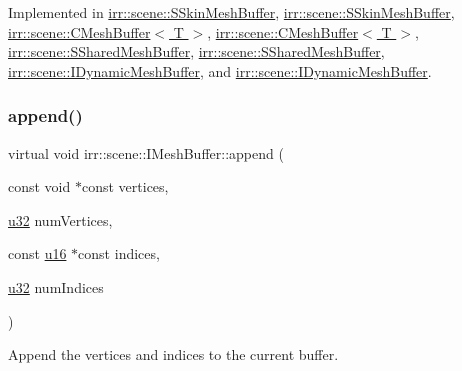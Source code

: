 Implemented in \hyperlink{structirr_1_1scene_1_1SSkinMeshBuffer_aded60392b4d793804bbf417c6bafa5f9}{irr\+::scene\+::\+S\+Skin\+Mesh\+Buffer}, \hyperlink{structirr_1_1scene_1_1SSkinMeshBuffer_aded60392b4d793804bbf417c6bafa5f9}{irr\+::scene\+::\+S\+Skin\+Mesh\+Buffer}, \hyperlink{classirr_1_1scene_1_1CMeshBuffer_a7efd85cba5d5d86bee8c2ea2fe0524d9}{irr\+::scene\+::\+C\+Mesh\+Buffer$<$ T $>$}, \hyperlink{classirr_1_1scene_1_1CMeshBuffer_a7efd85cba5d5d86bee8c2ea2fe0524d9}{irr\+::scene\+::\+C\+Mesh\+Buffer$<$ T $>$}, \hyperlink{structirr_1_1scene_1_1SSharedMeshBuffer_af7faf5e2b8245c4be3efb6e766281579}{irr\+::scene\+::\+S\+Shared\+Mesh\+Buffer}, \hyperlink{structirr_1_1scene_1_1SSharedMeshBuffer_af7faf5e2b8245c4be3efb6e766281579}{irr\+::scene\+::\+S\+Shared\+Mesh\+Buffer}, \hyperlink{classirr_1_1scene_1_1IDynamicMeshBuffer_a0fb73ead4f2d2d86e9fef8768be1a1ff}{irr\+::scene\+::\+I\+Dynamic\+Mesh\+Buffer}, and \hyperlink{classirr_1_1scene_1_1IDynamicMeshBuffer_a0fb73ead4f2d2d86e9fef8768be1a1ff}{irr\+::scene\+::\+I\+Dynamic\+Mesh\+Buffer}.

\mbox{\label{classirr_1_1scene_1_1IMeshBuffer_ac9e9d7fbb10175cc6f1596ba3fe4e8f9}} 
\subsubsection{\texorpdfstring{append()}{append()}\hspace{0.1cm}{\footnotesize\ttfamily [2/4]}}
{\footnotesize\ttfamily virtual void irr\+::scene\+::\+I\+Mesh\+Buffer\+::append (\begin{DoxyParamCaption}\item[{const void $\ast$const}]{vertices,  }\item[{\hyperlink{namespaceirr_a0416a53257075833e7002efd0a18e804}{u32}}]{num\+Vertices,  }\item[{const \hyperlink{namespaceirr_ae9f8ec82692ad3b83c21f555bfa70bcc}{u16} $\ast$const}]{indices,  }\item[{\hyperlink{namespaceirr_a0416a53257075833e7002efd0a18e804}{u32}}]{num\+Indices }\end{DoxyParamCaption})\hspace{0.3cm}{\ttfamily [pure virtual]}}



Append the vertices and indices to the current buffer. 

